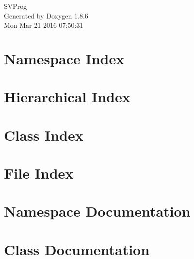 \documentclass[twoside]{book}
\newcommand{\clearemptydoublepage}{%
  \newpage{\pagestyle{empty}\cleardoublepage}%
}
\begin{document}
\hypersetup{pageanchor=false}
\begin{titlepage}
\vspace*{7cm}
\begin{center}%
{\Large S\-V\-Prog }\\
\vspace*{1cm}
{\large Generated by Doxygen 1.8.6}\\
\vspace*{0.5cm}
{\small Mon Mar 21 2016 07:50:31}\\
\end{center}
\end{titlepage}
\clearemptydoublepage
\tableofcontents
\clearemptydoublepage
{}
\hypersetup{pageanchor=true}

\chapter{Namespace Index}

\chapter{Hierarchical Index}

\chapter{Class Index}

\chapter{File Index}

\chapter{Namespace Documentation}



\chapter{Class Documentation}






















\end{document}

